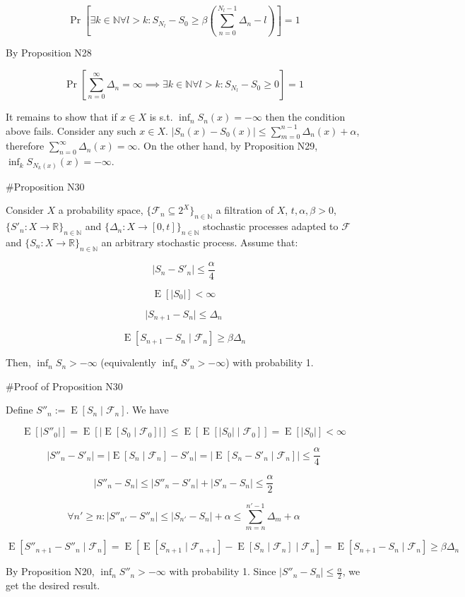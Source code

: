 \documentclass[a4paper]{article}
\DeclareMathOperator{\Prb}{Pr}
\DeclareMathOperator{\E}{E}
\newcommand{\Nats}{\mathbb{N}}
\newcommand{\Reals}{\mathbb{R}}
\newcommand{\Sq}[2]{\{#1\}_{#2 \in \Nats}}
\newcommand{\Sqn}[1]{\Sq{#1}{n}}
\newcommand{\Abs}[1]{\lvert #1 \rvert}
\newcommand{\F}{\mathcal{F}}
\begin{document}
$$\Prb[\exists k \in \Nats \forall l > k: S_{N_l} - S_0 \geq \beta (\sum_{n=0}^{N_l-1} \Delta_n -  l)]=1$$

By Proposition N28

$$\Prb[\sum_{n=0}^\infty  \Delta_n = \infty \implies \exists k \in \Nats \forall l > k: S_{N_l} - S_0 \geq 0]=1$$

It remains to show that if ${x \in X}$ is s.t. ${\inf_n S_n(x) = -\infty}$ then the condition above fails. Consider any such ${x \in X}$. ${\Abs{S_n(x) - S_0(x)} \leq \sum_{m=0}^{n-1} \Delta_n(x) + \alpha}$, therefore ${\sum_{n=0}^\infty  \Delta_n(x) = \infty}$. On the other hand, by Proposition N29, ${\inf_{k} S_{N_k(x)}(x) = -\infty}$.
 
\#Proposition N30

Consider ${X}$ a probability space, ${\{\F_n \subseteq 2^X\}_{n \in \Nats}}$ a filtration of ${X}$, ${t,\alpha,\beta > 0}$, ${\{S'_n:X \rightarrow \Reals\}_{n \in \Nats}}$ and ${\{\Delta_n:X \rightarrow [0,t]\}_{n \in \Nats}}$ stochastic processes adapted to ${\F}$ and ${\Sqn{S_n:X \rightarrow \Reals}}$ an arbitrary stochastic process. Assume that:

$$\Abs{S_n - S'_n} \leq \frac{\alpha}{4}$$

$$\E[\Abs{S_0}] < \infty$$

$$\Abs{S_{n+1}-S_n} \leq \Delta_n$$

$$\E[S_{n+1} - S_n \mid \F_n] \geq \beta \Delta_n$$

Then, ${\inf_{n} S_n > -\infty}$ (equivalently ${\inf_{n} S'_n > -\infty}$) with probability 1.

\#Proof of Proposition N30

Define ${S''_n:= \E[S_n \mid \F_n]}$. We have

$$\E[\Abs{S''_0}] = \E[\Abs{\E[S_0 \mid \F_0]}] \leq \E[\E[\Abs{S_0} \mid \F_0]] = \E[\Abs{S_0}] < \infty$$

$$\Abs{S''_n - S'_n} = \Abs{\E[S_n \mid \F_n] - S'_n} = \Abs{\E[S_n - S'_n \mid \F_n]} \leq \frac{\alpha}{4}$$

$$\Abs{S''_n - S_n} \leq \Abs{S''_n - S'_n} + \Abs{S'_n - S_n} \leq \frac{\alpha}{2}$$

$$\forall n' \geq n: \Abs{S''_{n'}-S''_n} \leq \Abs{S_{n'}-S_n} + \alpha \leq \sum_{m=n}^{n'-1} \Delta_m + \alpha$$

$$\E[S''_{n+1}-S''_n \mid \F_n] = \E[\E[S_{n+1} \mid \F_{n+1}]-\E[S_n \mid \F_n] \mid \F_n] = \E[S_{n+1}-S_n \mid \F_n] \geq \beta \Delta_n$$

By Proposition N20, ${\inf_n S''_n > -\infty}$ with probability 1. Since ${\Abs{S''_n - S_n} \leq \frac{\alpha}{2}}$, we get the desired result.
\end{document}
